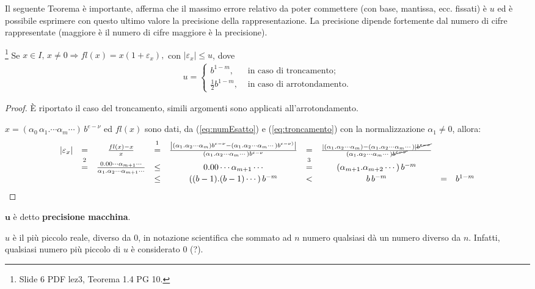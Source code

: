 Il seguente Teorema è importante, afferma che il massimo errore relativo da poter commettere (con base, mantissa, ecc. fissati) è $u$ ed è possibile esprimere con questo ultimo valore la precisione della rappresentazione. La precisione dipende fortemente dal numero di cifre rappresentate (maggiore è il numero di cifre maggiore è la precisione).

\begin{theorem}\footnote{Slide 6 PDF lez3, Teorema 1.4 PG 10.}\label{th:precMaccFL}
    Se $x\in I,\, x\neq 0\Rightarrow fl(x)=x(1+\varepsilon_x),$ con $ |\varepsilon_x|\leq u$, dove
    \begin{align}\label{eq:precMacc}
        u=
        \begin{cases}
            b^{1-m}, &\text{ in caso di troncamento};\\
            \frac{1}{2}b^{1-m}, &\text{ in caso di arrotondamento}.
        \end{cases}
    \end{align} 
\end{theorem}
\begin{proof}
    È riportato il caso del troncamento, simili argomenti sono applicati all'arrotondamento.
    
    $x=(\alpha_0\,\alpha_1.\cdots\alpha_m\cdots)\,b^{e-\nu}$ ed $fl(x)$ sono dati, da (\ref{eq:numEsatto}) e (\ref{eq:troncamento}) con la normalizzazione $\alpha_1\neq 0$, allora:
    \begin{equation*}
        \begin{matrix}
        |\varepsilon_x|&=&\frac{fl(x)-x}{x}&\overset{\footnotemark}{=}&\frac{\left|(\alpha_1.\alpha_2\cdots\alpha_m)b^{e-\nu}-(\alpha_1.\alpha_2\cdots\alpha_m\cdots)b^{e-\nu)}\right|}{(\alpha_1.\alpha_2\cdots\alpha_m\cdots)b^{e-\nu}}
        &=&\frac{|(\alpha_1.\alpha_2\cdots\alpha_m)-(\alpha_1.\alpha_2\cdots\alpha_m\cdots)|\cancel{b^{e-\nu}}}{(\alpha_1.\alpha_2\cdots\alpha_m\cdots)\cancel{b^{e-\nu}}}\\
        &\overset{\footnotemark}{=}&\frac{0.00\cdots\alpha_{m+1}\cdots}{\alpha_1.\alpha_2\cdots\alpha_{m+1}\cdots}&\leq& 0.00\cdots\alpha_{m+1}\cdots &\overset{\footnotemark}{=}&(\alpha_{m+1}.\alpha_{m+2}\cdots)\, b^{-m}\\
        &&&\leq&((b-1).(b-1)\cdots)\, b^{-m}&<&b\, b^{-m}&=& b^{1-m}
    \end{matrix}
    \end{equation*}
\end{proof}
\begin{definition}
    $\boldsymbol u$ è detto \textbf{precisione macchina}.
\end{definition}
$u$ è il più piccolo reale, diverso da 0, in notazione scientifica che sommato ad $n$ numero qualsiasi dà un numero diverso da $n$. Infatti, qualsiasi numero più piccolo di $u$ è considerato 0 (?).

